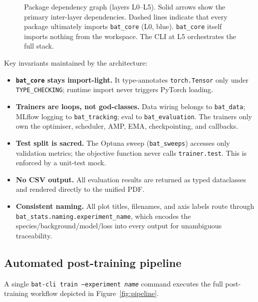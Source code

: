 \begin{figure}[h]
\begin{tikzpicture}
\end{tikzpicture}
\caption{Package dependency graph (layers L0--L5).  Solid arrows show the primary
inter-layer dependencies.  Dashed lines indicate that every package ultimately
imports \texttt{bat\_core} (L0, blue).  \texttt{bat\_core} itself imports nothing
from the workspace.  The CLI at L5 orchestrates the full stack.}
\label{fig:dep_graph}
\end{figure}

Key invariants maintained by the architecture:

\begin{itemize}[itemsep=2pt]
  \item \textbf{\texttt{bat\_core} stays import-light.}  It type-annotates
        \texttt{torch.Tensor} only under \texttt{TYPE\_CHECKING}; runtime import never
        triggers PyTorch loading.
  \item \textbf{Trainers are loops, not god-classes.}  Data wiring belongs to
        \texttt{bat\_data}; MLflow logging to \texttt{bat\_tracking}; eval to
        \texttt{bat\_evaluation}.  The trainers only own the optimiser, scheduler,
        AMP, EMA, checkpointing, and callbacks.
  \item \textbf{Test split is sacred.}  The Optuna sweep (\texttt{bat\_sweeps})
        accesses only validation metrics; the objective function never calls
        \texttt{trainer.test}.  This is enforced by a unit-test mock.
  \item \textbf{No CSV output.}  All evaluation results are returned as typed
        dataclasses and rendered directly to the unified PDF.
  \item \textbf{Consistent naming.}  All plot titles, filenames, and axis labels
        route through \texttt{bat\_stats\allowbreak.naming\allowbreak.experiment\_name},
        which encodes the species/background/model/loss into every output for
        unambiguous traceability.
\end{itemize}

\subsection{Automated post-training pipeline}

A single \texttt{bat-cli train --experiment \textit{name}} command executes the full
post-training workflow depicted in Figure~\ref{fig:pipeline}.

